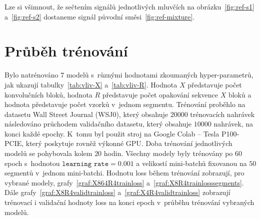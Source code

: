 Lze si všimnout, že sečtením signálů jednotlivých mluvčích na obrázku~\ref{fig:ref-s1} a~\ref{fig:ref-s2} dostaneme signál původní směsi~\ref{fig:ref-mixture}.


\section{Průběh trénování}
Bylo natrénováno $7$ modelů s~různými hodnotami zkoumaných hyper-parametrů, jak ukazují tabulky~\ref{tab:vliv-X} a~\ref{tab:vliv-R}. Hodnota $X$ představuje počet konvolučních bloků, hodnota $R$ představuje počet opakování sekvence $X$ bloků a hodnota  představuje počet vzorků v~jednom segmentu. Trénování proběhlo na datasetu Wall Street Journal (WSJ0), který obsahuje $20000$ trénovacích nahrávek následováno průchodem validačního datasetu, který obsahuje $10000$ nahrávek, na konci každé epochy. K~tomu byl použit stroj na Google Colab -- Tesla P100-PCIE, který poskytuje rovněž výkonné GPU. Doba trénování jednotlivých modelů se pohybovala kolem $20$ hodin. Všechny modely byly trénovány po 60 epoch s~hodnotou $\texttt{learning~rate} = 0.001$ a velikostí mini-batchů fixovanou na $50$ segmentů v~jednom mini-batchi. Hodnotu loss během trénování zobrazují, pro vybrané modely, grafy~\ref{graf:X864R4trainloss} a~\ref{graf:X8R4trainlosssegments}. Dále grafy~\ref{graf:X8R4validtrainloss} a~\ref{graf:X4R4validtrainloss} zobrazují trénovací i validační hodnoty loss na konci epoch v~průběhu trénování vybraných modelů.


